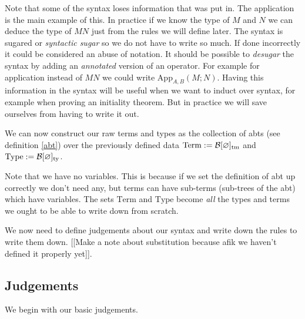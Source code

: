 \begin{remark}
    Note that some of the syntax loses information that was put in. The application is the main example of this. In practice if we know the type of $M$ and $N$ we can deduce the type of $M N$ just from the rules we will define later. The syntax is sugared or \emph{syntactic sugar} so we do not have to write so much. If done incorrectly it could be considered an abuse of notation. It should be possible to \emph{desugar} the syntax by adding an \emph{annotated} version of an operator. For example for application instead of $M N$ we could write $\mathrm{App}_{A,B}(M;N)$. Having this information in the syntax will be useful when we want to induct over syntax, for example when proving an initiality theorem. But in practice we will save ourselves from having to write it out.
\end{remark}

\begin{defin}
    We can now construct our raw terms and types as the collection of abts (see definition \ref{abt}) over the previously defined data $\mathrm{Term} := \mathcal{B}[\varnothing]_{\mathrm{tm}}$ and $\mathrm{Type} := \mathcal{B}[\varnothing]_{\mathrm{ty}}$.
\end{defin}

\begin{remark}
    Note that we have no variables. This is because if we set the definition of abt up correctly we don't need any, but terms can have sub-terms (sub-trees of the abt) which have variables. The sets $\mathrm{Term}$ and $\mathrm{Type}$ become \emph{all} the types and terms we ought to be able to write down from scratch.
\end{remark}

We now need to define judgements about our syntax and write down the rules to write them down. [[Make a note about substitution because afik we haven't defined it properly yet]]. 

\subsection{Judgements}

We begin with our basic judgements.

